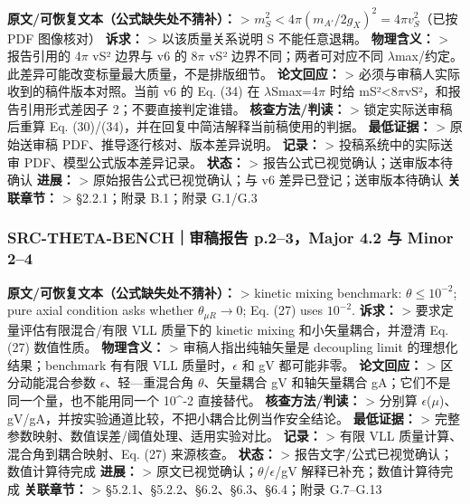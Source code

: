 \documentclass[
  chinese,
  UTF8]{ctexart}
\begin{document}
\textbf{原文/可恢复文本（公式缺失处不猜补）：} \textgreater{}
\(m_S^2<4\pi(m_{A\prime}/2g_X)^2=4\pi v_S^2\)（已按 PDF 图像核对）
\textbf{诉求：} \textgreater{} 以该质量关系说明 S 不能任意退耦。
\textbf{物理含义：} \textgreater{} 报告引用的 4\ensuremath{\pi} vS²
边界与 v6 的 8\ensuremath{\pi} vS² 边界不同；两者可对应不同
\ensuremath{\lambda}max/约定。此差异可能改变标量最大质量，不是排版细节。
\textbf{论文回应：} \textgreater{}
必须与审稿人实际收到的稿件版本对照。当前 v6 的 Eq. (34) 在
\ensuremath{\lambda}Smax=4\ensuremath{\pi} 时给
mS²\textless8\ensuremath{\pi}vS²，和报告引用形式差因子
2；不要直接判定谁错。 \textbf{核查方法/判读：} \textgreater{}
锁定实际送审稿后重算 Eq. (30)/(34)，并在回复中简洁解释当前稿使用的判据。
\textbf{最低证据：} \textgreater{} 原始送审稿
PDF、推导逐行核对、版本差异说明。 \textbf{记录：} \textgreater{}
投稿系统中的实际送审 PDF、模型公式版本差异记录。 \textbf{状态：}
\textgreater{} 报告公式已视觉确认；送审版本待确认 \textbf{进展：}
\textgreater{} 原始报告公式已视觉确认；与 v6 差异已登记；送审版本待确认
\textbf{关联章节：} \textgreater{} §2.2.1；附录 B.1；附录 G.1/G.3

\subsubsection{SRC-THETA-BENCH｜审稿报告 p.2--3，Major 4.2 与 Minor
2--4}\label{src-theta-benchux5ba1ux7a3fux62a5ux544a-p.23major-4.2-ux4e0e-minor-24}

\textbf{原文/可恢复文本（公式缺失处不猜补）：} \textgreater{} kinetic
mixing benchmark: \(\theta\leq10^{-2}\); pure axial condition asks
whether \(\theta_{\mu R}\to0\); Eq. (27) uses \(10^{-2}\).
\textbf{诉求：} \textgreater{} 要求定量评估有限混合/有限 VLL 质量下的
kinetic mixing 和小矢量耦合，并澄清 Eq. (27) 数值性质。
\textbf{物理含义：} \textgreater{} 审稿人指出纯轴矢量是 decoupling limit
的理想化结果；benchmark 有有限 VLL 质量时，\ensuremath{\epsilon} 和 gV
都可能非零。 \textbf{论文回应：} \textgreater{} 区分动能混合参数
\ensuremath{\epsilon}、轻---重混合角 \ensuremath{\theta}、矢量耦合 gV
和轴矢量耦合 gA；它们不是同一个量，也不能用同一个 10\^{}-2 直接替代。
\textbf{核查方法/判读：} \textgreater{} 分别算
\ensuremath{\epsilon}(\ensuremath{\mu})、gV/gA，并按实验通道比较，不把小耦合比例当作安全结论。
\textbf{最低证据：} \textgreater{}
完整参数映射、数值误差/阈值处理、适用实验对比。 \textbf{记录：}
\textgreater{} 有限 VLL 质量计算、混合角到耦合映射、Eq. (27) 来源核查。
\textbf{状态：} \textgreater{} 报告文字/公式已视觉确认；数值计算待完成
\textbf{进展：} \textgreater{}
原文已视觉确认；\ensuremath{\theta}/\ensuremath{\epsilon}/gV
解释已补充；数值计算待完成 \textbf{关联章节：} \textgreater{}
§5.2.1、§5.2.2、§6.2、§6.3、§6.4；附录 G.7--G.13
\end{document}
